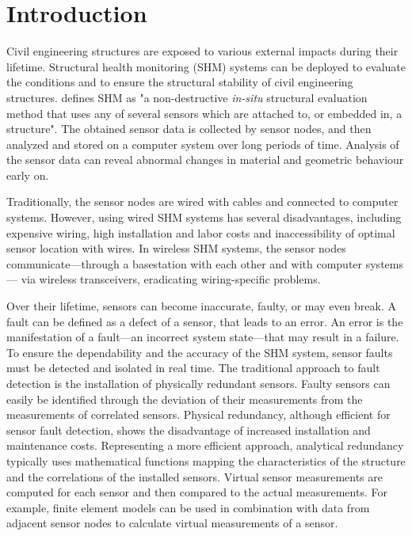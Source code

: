 \documentclass[12pt,a4paper]{scrartcl}
\begin{document}

\section*{Introduction}

Civil engineering structures are exposed to various external impacts during their lifetime. 
Structural health monitoring (SHM) systems can be deployed to evaluate the conditions and to ensure the structural stability of civil engineering structures.
\cite[4]{BisbySHM} defines SHM as "a non-destructive \textit{in-situ} structural evaluation method that uses any of several sensors which are attached to, or embedded in, a structure".
The obtained sensor data is collected by sensor nodes, and then analyzed and stored on a computer system over long periods of time. 
Analysis of the sensor data can reveal abnormal changes in material and geometric behaviour early on.

Traditionally, the sensor nodes are wired with cables and connected to computer systems.
However, using wired SHM systems has several disadvantages, including expensive wiring, high installation and labor costs and inaccessibility of optimal sensor location with wires.
In wireless SHM systems, the sensor nodes communicate---through a basestation with each other and with computer systems--- via wireless transceivers, eradicating wiring-specific problems.

Over their lifetime, sensors can become inaccurate, faulty, or may even break.
A fault can be defined as a defect of a sensor, that leads to an error. An error is the manifestation of a fault---an incorrect system state---that may result in a failure.
To ensure the dependability and the accuracy of the SHM system, sensor faults must be detected and isolated in real time. 
The traditional approach to fault detection is the installation of physically redundant sensors.
Faulty sensors can easily be identified through the deviation of their measurements from the measurements of correlated sensors.
Physical redundancy, although efficient for sensor fault detection, shows the disadvantage of increased installation and maintenance costs. 
Representing a more efficient approach, analytical redundancy typically uses mathematical functions mapping the characteristics of the structure and the correlations of the installed sensors. Virtual sensor measurements are computed for each sensor and then compared to the actual measurements. 
For example, finite element models can be used in combination with data from adjacent sensor nodes to calculate virtual measurements of a sensor.
\citep{Smarsly2014}
\end{document}
